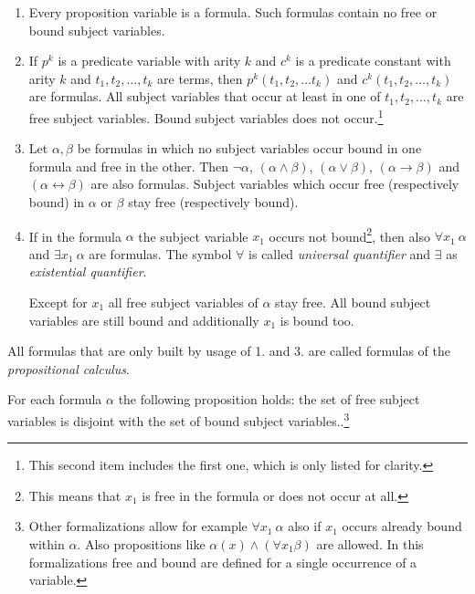 \documentclass[a4paper,german,10pt,twoside]{book}
\theoremstyle{definition}
\theoremstyle{remark}
\begin{document}
\begin{enumerate}

\item Every proposition variable is a formula. Such formulas contain no free or bound subject variables.

\item If $p^k$ is a predicate variable with arity $k$ and $c^k$ is a predicate constant with arity $k$ and $t_1, t_2, \ldots, t_k$ are terms, then $p^k(t_1, t_2, \ldots t_k)$ and $c^k(t_1, t_2, \ldots, t_k)$ are formulas. All subject variables that occur at least in one of $t_1, t_2, \ldots, t_k$ are free subject variables. Bound subject variables does not occur.\footnote{This second item includes the first one, which is only listed for clarity.} 

\item Let $\alpha, \beta$ be formulas in which no subject variables occur bound in one formula and free in the other. Then $\neg \alpha$, $(\alpha \land \beta)$, $(\alpha \lor \beta)$, $(\alpha \rightarrow \beta)$ and $(\alpha \leftrightarrow \beta)$ are also formulas. Subject variables which occur free (respectively bound) in $\alpha$ or $\beta$ stay free (respectively bound).

\item If in the formula $\alpha$ the subject variable $x_1$ occurs not bound\footnote{This means that $x_1$ is free in the formula or does not occur at all.}, then also $\forall x_1~\alpha$ and $\exists x_1~\alpha$ are formulas. The symbol $\forall$ is called \emph{universal quantifier} and $\exists$ as
\emph{existential quantifier}.

Except for $x_1$ all free subject variables of $\alpha$ stay free. All bound subject variables are still bound and additionally $x_1$ is bound too.

\end{enumerate}

All formulas that are only built by usage of 1. and 3. are called formulas of the \emph{propositional calculus}.

\par
For each formula $\alpha$ the following proposition holds: the set of free subject variables is disjoint with the set of bound subject variables..\footnote{Other formalizations allow for example $\forall x_1~\alpha$ also if $x_1$ occurs already bound within $\alpha$. Also propositions like $\alpha(x) \land (\forall x_1 \beta)$ are allowed. In this formalizations
free and bound are defined for a single occurrence of a variable.}
\end{document}
